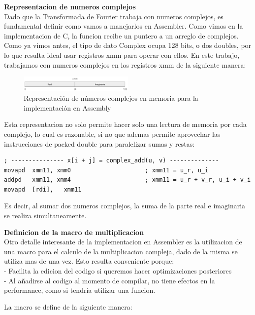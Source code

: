\documentclass[a4paper]{article}
\begin{document}
\textbf{Representacion de numeros complejos} \\
Dado que la Transformada de Fourier trabaja con numeros complejos, es fundamental definir como vamos a manejarlos en Assembler. Como vimos en la implementacion de C, la
funcion recibe un puntero a un arreglo de complejos. Como ya vimos antes, el tipo de dato Complex ocupa 128 bits, o dos doubles, por lo que resulta ideal usar registros
xmm para operar con ellos. En este trabajo, trabajamos con numeros complejos en los registros xmm de la siguiente manera:

\begin{figure}[h]
    \centering
    \includegraphics[width=0.5\textwidth]{extra/xmm complex.png}
    \caption{Representación de números complejos en memoria para la implementación en Assembly}
    \label{fig:asm_complex_representation}
\end{figure}
Esta representacion no solo permite hacer solo una lectura de memoria por cada complejo, lo cual es razonable, si no que ademas permite aprovechar las
instrucciones de packed double para paralelizar sumas y restas:

\begin{verbatim}    
; --------------- x[i + j] = complex_add(u, v) --------------
movapd  xmm11, xmm0                     ; xmm11 = u_r, u_i
addpd   xmm11, xmm4                     ; xmm11 = u_r + v_r, u_i + v_i
movapd  [rdi],   xmm11
\end{verbatim}

Es decir, al sumar dos numeros complejos, la suma de la parte real e imaginaria se realiza simultaneamente.

\textbf{Definicion de la macro de multiplicacion} \\
Otro detalle interesante de la implementacion en Assembler es la utilizacion de una macro para el calculo de la multiplicacion compleja, dado de la misma se
utiliza mas de una vez. Esto resulta conveniente porque:\\

- Facilita la edicion del codigo si queremos hacer optimizaciones posteriores\\
- Al añadirse al codigo al momento de compilar, no tiene efectos en la performance, como si tendría utilizar una funcion.

La macro se define de la siguiente manera:
\end{document}
